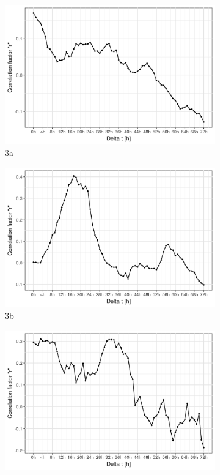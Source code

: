 \documentclass[12pt,a4paper,spanish]{article}
\begin{document}
\begin{figure}[h!]
    \centering
    \begin{subfigure}{.5\textwidth}
    \centering
    \includegraphics[width=.8\linewidth,scale=0.8]{usfzangwid_corfac.png}
    \caption{3a}
    \label{fig:sfig31}
    \end{subfigure}%
    \begin{subfigure}{.5\textwidth}
    \centering
    \includegraphics[width=.8\linewidth,scale=0.8]{usfzkie_corfac.png}
    \caption{3b}
    \label{fig:sfig32}
    \end{subfigure}
    \begin{subfigure}{.5\textwidth}
    \centering
    \includegraphics[width=.8\linewidth,scale=0.8]{tchzangwid_corfac.png}

\end{subfigure}
\end{figure}
\end{document}
